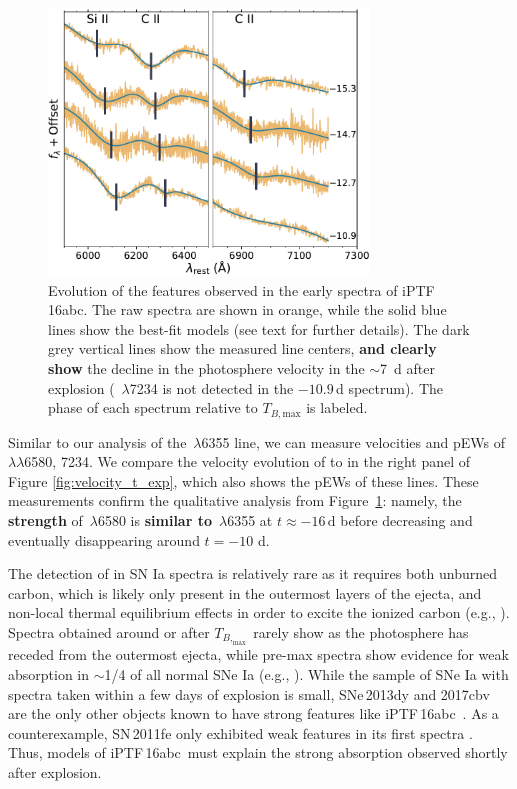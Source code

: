 \documentclass[twocolumn]{aastex61}
\newcommand{\abc}{iPTF\,16abc}
\begin{document}
\begin{figure}[]
  \centering
  \includegraphics[width=3.35in]{CarbonFeature.pdf}
  \caption{
  Evolution of the  features observed in the early spectra of \abc.
  The raw spectra are shown in orange, while the solid blue lines show the
  best-fit models (see text for further details). The dark grey vertical lines
  show the measured line centers, \textbf{and clearly show} the decline in the
  photosphere velocity in the $\sim$7~d after explosion (
  \,$\lambda$7234 is not detected in the $-10.9$\,d spectrum). The
  phase of each spectrum relative to $T_{B,\mathrm{max}}$ is labeled.
  }
  \label{fig:carbon}
\end{figure}

Similar to our analysis of the \,$\lambda$6355 line, we can measure
velocities and pEWs of \,$\lambda\lambda$6580, 7234. We compare the
velocity evolution of  to  in the right panel of Figure
\ref{fig:velocity_t_exp}, which also shows the pEWs of these lines. These
measurements confirm the qualitative analysis from Figure~\ref{fig:carbon}:
namely, the \textbf{strength} of \,$\lambda$6580 is \textbf{similar
to} \,$\lambda$6355 at $t \approx -16 \, \mathrm{d}$ before
decreasing and eventually disappearing around $t = -10$ d.

The detection of  in SN Ia spectra is relatively rare as it requires
both unburned carbon, which is likely only present in the outermost layers of
the ejecta, and non-local thermal equilibrium effects in order to excite the
ionized carbon (e.g., \citealt{2007ApJ...654L..53T}). Spectra obtained around
or after $T_{B,_\mathrm{max}}$ rarely show  as the photosphere has
receded from the outermost ejecta, while pre-max spectra show evidence for
weak  absorption in $\sim$1/4 of all normal SNe Ia (e.g.,
\citealt{2011ApJ...732...30P,2011ApJ...743...27T,2012MNRAS.425.1917S}). While
the sample of SNe Ia with spectra taken within a few days of explosion is
small, SNe\,2013dy and 2017cbv are the only other objects known to have strong
 features like \abc\
\citep{2013ApJ...778L..15Z,2017ApJ...845L..11H}. As a counterexample,
SN\,2011fe only exhibited weak  features in its first spectra
\citep{2012ApJ...752L..26P}. Thus, models of \abc\ must explain the strong
\ion{C}{2} absorption observed shortly after explosion.
\end{document}
